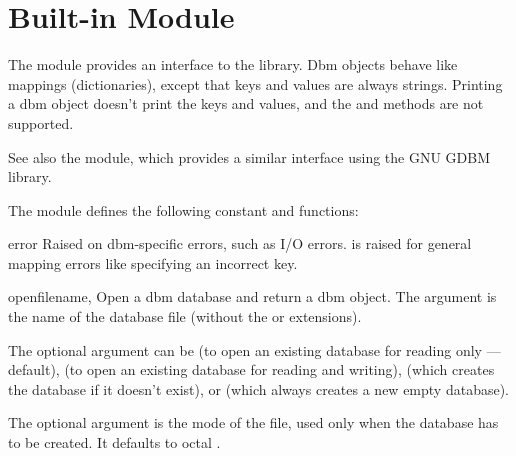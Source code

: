 \section{Built-in Module }
\label{module-dbm}

The  module provides an interface to the \UNIX{}
 library.  Dbm objects behave like mappings
(dictionaries), except that keys and values are always strings.
Printing a dbm object doesn't print the keys and values, and the
 and  methods are not supported.

See also the  module, which provides a similar interface
using the GNU GDBM library.

The module defines the following constant and functions:

\begin{excdesc}{error}
Raised on dbm-specific errors, such as I/O errors.  is
raised for general mapping errors like specifying an incorrect key.
\end{excdesc}

\begin{funcdesc}{open}{filename, }
Open a dbm database and return a dbm object.  The 
argument is the name of the database file (without the  or
 extensions).

The optional  argument can be
 (to open an existing database for reading only --- default),
 (to open an existing database for reading and writing),
 (which creates the database if it doesn't exist), or
 (which always creates a new empty database).

The optional  argument is the \UNIX{} mode of the file, used
only when the database has to be created.  It defaults to octal
.
\end{funcdesc}
